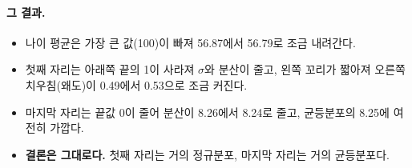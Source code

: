 \documentclass[11pt]{article}
\begin{document}
\paragraph{그 결과.}
\begin{itemize}
  \item 나이 평균은 가장 큰 값(100)이 빠져 56.87에서 56.79로 조금 내려간다.
  \item 첫째 자리는 아래쪽 끝의 1이 사라져 $\sigma$와 분산이 줄고, 왼쪽 꼬리가 짧아져 오른쪽
    치우침(왜도)이 0.49에서 0.53으로 조금 커진다.
  \item 마지막 자리는 끝값 0이 줄어 분산이 8.26에서 8.24로 줄고, 균등분포의 8.25에 여전히 가깝다.
  \item \textbf{결론은 그대로다.} 첫째 자리는 거의 정규분포, 마지막 자리는 거의 균등분포다.
\end{itemize}
\end{document}
